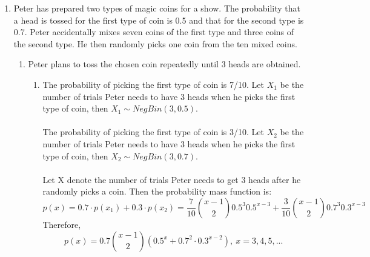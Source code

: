 \documentclass[11pt]{article}
\begin{document}
\begin{enumerate}[label=\textbf{Question \arabic*:},start=1]
\item
Peter has prepared two types of magic coins for a show. The probability that a head is tossed for the first type of coin is 0.5 and that for the second type is 0.7. Peter accidentally mixes seven coins of the first type and three coins of the second type. 
He then randomly picks one coin from the ten mixed coins.
\begin{enumerate}
  \item Peter plans to toss the chosen coin repeatedly until 3 heads are obtained.
  \begin{enumerate}
    \item The probability of picking the first type of coin is 7/10. Let \( X_1 \) be the number of trials Peter needs to have 3 heads when he picks the first type of coin, then \( X_1 \sim NegBin(3, 0.5) \). \\
    \\
    The probability of picking the first type of coin is 3/10. Let \( X_2 \) be the number of trials Peter needs to have 3 heads when he picks the first type of coin, then \( X_2 \sim NegBin(3, 0.7) \). \\
    \\
    Let X denote the number of trials Peter needs to get 3 heads after he randomly picks a coin. Then the probability mass function is:
\[
p(x) = 0.7 \cdot p(x_1) + 0.3 \cdot p(x_2) =\frac{7}{10} {x-1 \choose 2} 0.5^3 0.5^{x-3} + \frac{3}{10} {x-1 \choose 2} 0.7^3 0.3^{x-3} 
\]
Therefore,
\[
p(x) = 0.7{x-1 \choose 2}(0.5^x + 0.7^2 \cdot 0.3^{x-2}), \ x = 3, 4, 5, ...
\]



\end{enumerate}
\end{enumerate}
\end{enumerate}
\end{document}
